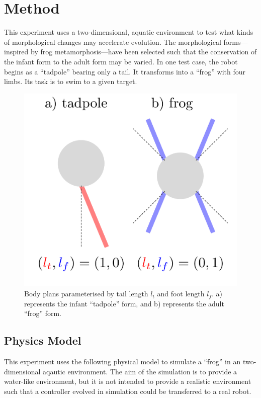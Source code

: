 \section{Method}

This experiment uses a two-dimensional, aquatic environment to test
what kinds of morphological changes may accelerate evolution. The
morphological forms---inspired by frog metamorphosis---have been
selected such that the conservation of the infant form to the adult
form may be varied. In one test case, the robot begins as a
``tadpole'' bearing only a tail. It transforms into a ``frog'' with
four limbs. Its task is to swim to a given target.  

\begin{figure}
  \begin{center} 
    \includegraphics[scale=0.5]{fig/forms.pdf} 
  \end{center} 
  \caption{Body plans parameterised by tail length $l_t$ and foot
    length $l_f$. a) represents the infant ``tadpole'' form, and b)
    represents the adult ``frog'' form. }
  \label{morphology}
\end{figure}


\subsection{Physics Model}

This experiment uses the following physical model to simulate a
``frog'' in an two-dimensional aqautic environment.  The aim of the
simulation is to provide a water-like environment, but it is not
intended to provide a realistic environment such that a controller
evolved in simulation could be transferred to a real
robot.  


